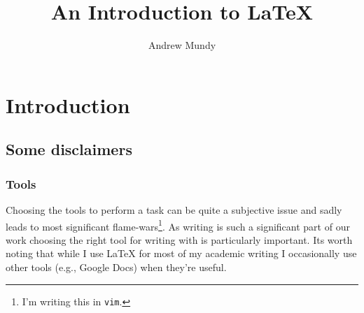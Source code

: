 \title{An Introduction to \LaTeX{}}
\author{Andrew Mundy}
\date{}  %

\usepackage{sourcecodepro}

\usepackage{minted}

\usepackage{graphicx}
\usepackage[export]{adjustbox}  %

\usepackage{booktabs}


  \maketitle

  \section{Introduction}
  \subsection{Some disclaimers}
  \subsubsection{Tools}

  Choosing the tools to perform a task can be quite a subjective issue and sadly leads to most significant flame-wars\footnote{I'm writing this in \texttt{vim}.}.
  As writing is such a significant part of our work choosing the right tool for writing with is particularly important.
  Its worth noting that while I use LaTeX for most of my academic writing I occasionally use other tools (e.g., Google Docs) when they're useful.

